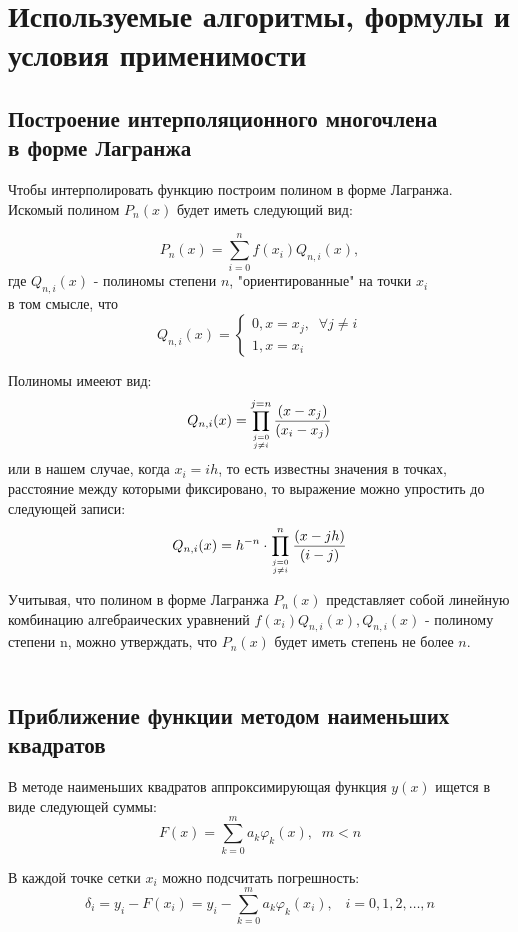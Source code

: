 \documentclass[a4paper, 14pt]{extreport}
\begin{document}
\section*{Используемые алгоритмы, формулы и условия применимости}
\subsection*{Построение интерполяционного многочлена \\ в форме Лагранжа}
\;\;\;\;\;\;Чтобы интерполировать функцию построим полином в форме Лагранжа. \\ Искомый полином $P_{n}(x)$ будет иметь следующий вид:

$$P_{n}(x) = \sum_{i = 0}^{n} f\left(x_{i}\right) Q_{n, i}(x),$$
где $Q_{n, i}(x)$ - полиномы степени $n$, "ориентированные" на точки $x_{i}$ \\ в том смысле, что
$$
Q_{n, i}(x)=\left\{\begin{array}{l}0, x=x_{j}, \; \; \forall j \neq i \\ 1, x=x_{i}\end{array}\right. $$

{Полиномы имееют вид: $$Q_{n, i}(x)=\prod_{j=0 \atop j \neq i}^{j=n} \frac{\left(x-x_{j}\right)}{\left(x_{i}-x_{j}\right)}$$}
или в нашем случае, когда $x_{i} = ih$, то есть известны значения в точках, расстояние между которыми фиксировано, то выражение можно упростить до следующей записи:
$$	
Q_{n, i}(x)=h^{-n} \cdot \prod_{j=0 \atop j \neq i}^{n} \frac{(x-j h)}{(i-j)}
$$

Учитывая, что полином в форме Лагранжа $P_{n}(x)$ представляет собой линейную комбинацию алгебраических уравнений $f(x_{i})Q_{n, i}(x), Q_{n, i}(x)$ - полиному степени n, можно утверждать, что $P_{n}(x)$ будет иметь степень не более $n$.
\\ \\
\subsection*{Приближение функции методом наименьших квадратов}

\;\;\;\;\;\;В методе наименьших квадратов аппроксимирующая функция $y(x)$ ищется в виде следующей суммы:
$$F(x)=\sum_{k=0}^{m} a_{k} \varphi_{k}(x), \; \; m<n$$

{В каждой точке сетки $x_{i}$ можно подсчитать погрешность:}
$$\delta_{i}=y_{i}-F\left(x_{i}\right)=y_{i}-\sum_{k=0}^{m} a_{k} \varphi_{k}\left(x_{i}\right), \; \; \; i=0,1,2, \ldots, n$$
\end{document}
